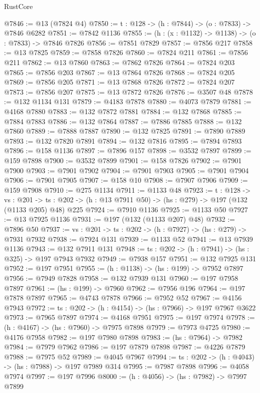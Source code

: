 \begin{lexlean}{RustCore}
\begin{coremodule}
@7846 := @13 (@7824 @4)
@7850 := {t : @128} -> (h : @7844) -> (o : @7833) -> @7846 @6282
@7851 := @7842 @1136
@7855 := (h : (x : @1132) -> @1138) -> (o : @7833) -> @7846 @7826
@7856 := @7851 @7829
@7857 := @7856 @217
@7858 := @13 @7825
@7859 := @7858 @7826
@7860 := @7824 @211
@7861 := @7856 @211
@7862 := @13 @7860
@7863 := @7862 @7826
@7864 := @7824 @203
@7865 := @7856 @203
@7867 := @13 @7864 @7826
@7868 := @7824 @205
@7869 := @7856 @205
@7871 := @13 @7868 @7826
@7872 := @7824 @207
@7873 := @7856 @207
@7875 := @13 @7872 @7826
@7876 := @3507 @48
@7878 := @132 @1134 @131
@7879 := @4183 @7878
@7880 := @4073 @7879
@7881 := @4168 @7880
@7883 := @132 @7872 @7881
@7884 := @132 @7868
@7885 := @7884 @7883
@7886 := @132 @7864
@7887 := @7886 @7885
@7888 := @132 @7860
@7889 := @7888 @7887
@7890 := @132 @7825
@7891 := @7890 @7889
@7893 := @132 @7820 @7891
@7894 := @132 @7816
@7895 := @7894 @7893
@7896 := @158 @1136
@7897 := @7896 @157
@7898 := @3532 @7897
@7899 := @159 @7898
@7900 := @3532 @7899
@7901 := @158 @7826
@7902 := @7901 @7900
@7903 := @7901 @7902
@7904 := @7901 @7903
@7905 := @7901 @7904
@7906 := @7901 @7905
@7907 := @158 @10
@7908 := @7907 @7906
@7909 := @159 @7908
@7910 := @275 @1134
@7911 := @1133 @48
@7923 := {t : @128} ->
  {vs : @201} ->
  {ts : @202} -> (h : @13 @7911 @50) -> (hs : @279) -> @197 (@132 (@1133 @205) @48) @225
@7924 := @7910 @1136
@7925 := @1133 @50
@7927 := @13 @7925 @1136
@7931 := @197 (@132 (@1133 @207) @48)
@7932 := @7896 @50
@7937 := {vs : @201} -> {ts : @202} -> (h : @7927) -> (hs : @279) -> @7931 @7932
@7938 := @7924 @131
@7939 := @1133 @52
@7941 := @13 @7939 @1136
@7943 := @132 @7911 @131
@7948 := {ts : @202} -> (h : @7941) -> (hs : @325) -> @197 @7943 @7932
@7949 := @7938 @157
@7951 := @132 @7925 @131
@7952 := @197 @7951
@7955 := (h : @1138) -> (hs : @199) -> @7952 @7897
@7956 := @7949 @7828
@7958 := @132 @7939 @131
@7960 := @197 @7958 @7897
@7961 := (hs : @199) -> @7960
@7962 := @7956 @196
@7964 := @197 @7878 @7897
@7965 := @4743 @7878
@7966 := @7952 @52
@7967 := @4156 @7943
@7972 := {ts : @202} -> (h : @4154) -> (hs : @7966) -> @197 @7967 @3622
@7973 := @7965 @7897
@7974 := @4168 @7951
@7975 := @197 @7974
@7978 := (h : @4167) -> (hs : @7960) -> @7975 @7898
@7979 := @7973 @4725
@7980 := @4176 @7958
@7982 := @197 @7980 @7898
@7983 := (hs : @7964) -> @7982
@7984 := @7979 @7962
@7986 := @197 @7879 @7898
@7987 := @4226 @7879
@7988 := @7975 @52
@7989 := @4045 @7967
@7994 := {ts : @202} -> (h : @4043) -> (hs : @7988) -> @197 @7989 @314
@7995 := @7987 @7898
@7996 := @4058 @7974
@7997 := @197 @7996
@8000 := (h : @4056) -> (hs : @7982) -> @7997 @7899

\end{coremodule}
\end{lexlean}
